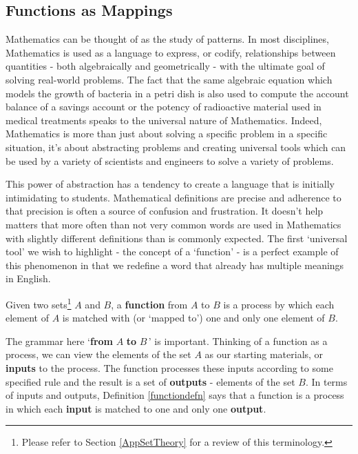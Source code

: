 \documentclass{ximera}
\begin{document}
	\author{Stitz-Zeager}

\label{FunctionsandtheirRepresentations}


\subsection{Functions as Mappings}

Mathematics can be thought of as the study of patterns.   In most disciplines, Mathematics is used as a language to express, or codify, relationships between quantities  - both algebraically and geometrically - with the ultimate goal of solving real-world problems.   The fact that the same algebraic equation which models the growth of bacteria in a petri dish is also used to compute the account balance of a savings account or the potency of radioactive material used in medical treatments speaks to the universal nature of Mathematics.   Indeed, Mathematics is more than just about solving a specific problem in a specific situation, it's about abstracting problems and creating universal tools which can be used by a variety of scientists and engineers to solve a variety of problems.  

This power of abstraction has a tendency to create a language that is initially intimidating to students.  Mathematical definitions are precise and adherence to that precision is often a source of confusion and frustration.  It doesn't help matters that more often than not very common words are used in Mathematics with slightly different definitions than is commonly expected.  The first `universal tool' we wish to highlight - the concept of a `function' - is a perfect example of this phenomenon in that we redefine a word that already has multiple meanings in English.  


\begin{definition}\label{functiondefn}


Given two sets\footnote{Please refer to Section \ref{AppSetTheory} for a review of this terminology.} $A$ and $B$, a   \textbf{function} from $A$ to $B$ is a process by which each element of $A$ is matched with (or `mapped to')  one and only one element of $B$.   

\end{definition}


The grammar here `\textbf{from} $A$ \textbf{to} $B\,$'  is important.  Thinking of a function as a process, we can view the elements of the set $A$ as our starting materials, or \textbf{inputs} to the process.  The function  processes these inputs according to some specified rule and the result is a set of  \textbf{outputs}  - elements of the set $B$. In terms of inputs and outputs, Definition \ref{functiondefn}  says that a function is a process in which each \textbf{input} is matched to one and only one \textbf{output}.
\end{document}
